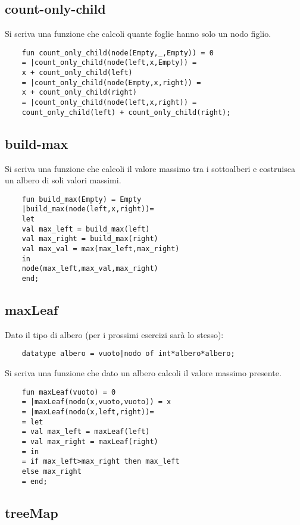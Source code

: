 \subsection{count-only-child}

Si scriva una funzione che calcoli quante foglie hanno solo un nodo figlio.

\begin{lstlisting}
    fun count_only_child(node(Empty,_,Empty)) = 0
    = |count_only_child(node(left,x,Empty)) = 
    x + count_only_child(left)
    = |count_only_child(node(Empty,x,right)) = 
    x + count_only_child(right)
    = |count_only_child(node(left,x,right)) = 
    count_only_child(left) + count_only_child(right);
\end{lstlisting}

\subsection{build-max}

Si scriva una funzione che calcoli il valore massimo tra i sottoalberi e costruisca un albero di soli valori massimi.

\begin{lstlisting}
    fun build_max(Empty) = Empty
    |build_max(node(left,x,right))=
    let
    val max_left = build_max(left)
    val max_right = build_max(right)
    val max_val = max(max_left,max_right)
    in
    node(max_left,max_val,max_right)
    end;
\end{lstlisting}

\subsection{maxLeaf}

Dato il tipo di albero (per i prossimi esercizi sarà lo stesso):
\begin{lstlisting}
    datatype albero = vuoto|nodo of int*albero*albero;
\end{lstlisting}
Si scriva una funzione che dato un albero calcoli il valore massimo presente.

\begin{lstlisting}
    fun maxLeaf(vuoto) = 0
    = |maxLeaf(nodo(x,vuoto,vuoto)) = x
    = |maxLeaf(nodo(x,left,right))=
    = let
    = val max_left = maxLeaf(left)
    = val max_right = maxLeaf(right)
    = in
    = if max_left>max_right then max_left 
    else max_right
    = end;
\end{lstlisting}

\subsection{treeMap}

